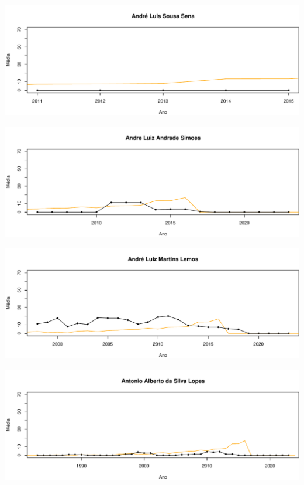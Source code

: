 \documentclass[12pt,brazil]{article}\usepackage[]{graphicx}\usepackage[]{xcolor}
\makeatletter
\def\maxwidth{ %
  \ifdim\Gin@nat@width>\linewidth
    \linewidth
  \else
    \Gin@nat@width
  \fi
}
\makeatother
\begin{document}
\vspace{0.5cm}


{\centering \includegraphics[width=\maxwidth]{figure/mediamovel-3} 

}



\vspace{0.5cm}


{\centering \includegraphics[width=\maxwidth]{figure/mediamovel-4} 

}



\vspace{0.5cm}


{\centering \includegraphics[width=\maxwidth]{figure/mediamovel-5} 

}



\vspace{0.5cm}


{\centering \includegraphics[width=\maxwidth]{figure/mediamovel-6} 

}
\end{document}
